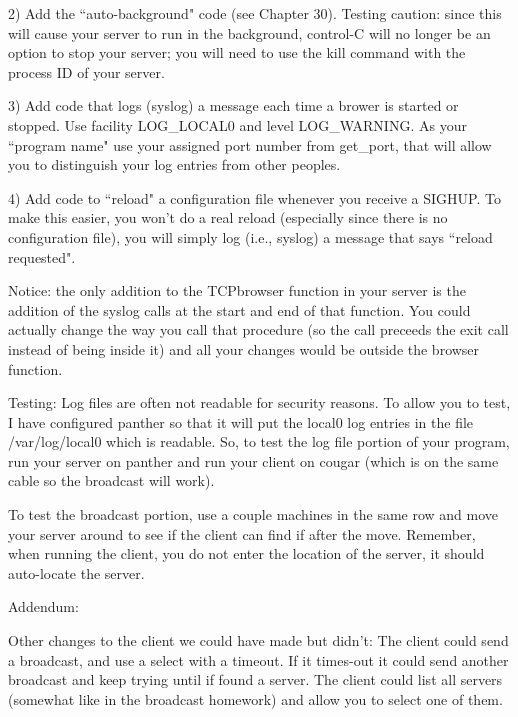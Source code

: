 2) Add the ``auto-background" code (see Chapter 30).
Testing caution: since this will cause your server to run in the background,
control-C will no longer be an option to stop your server; you will
need to use the {\ltt{}kill} command with the process ID of your server.

3) Add code that logs ({\ltt{}syslog}) a message each time a brower
is started or stopped. Use facility {\ltt{}LOG_LOCAL0}
and level {\ltt{}LOG_WARNING}.
As your ``program name" use your assigned port number from {\ltt{}get_port},
that will allow you to distinguish your log entries from other peoples.

4) Add code to ``reload" a configuration file whenever you
receive a {\ltt{}SIGHUP}.
To make this easier, you won't do a real reload (especially since
there is no configuration file), you will simply
log (i.e., {\ltt{}syslog}) a message that says ``reload requested".

Notice: the only addition to the {\ltt{}TCPbrowser} function in your server
is the addition of the {\ltt{}syslog} calls at the start and end of that
function.
You could actually change the way you call that procedure (so the call
preceeds the exit call instead of being inside it) and all your changes
would be outside the browser function.

Testing:
Log files are often not readable for security reasons.
To allow you to test,
I have configured {\ltt{}panther} so that it will put the {\ltt{}local0} log entries
in the file {\ltt{}/var/log/local0} which is readable.
So, to test the log file portion of your program, run your server on {\ltt{}panther} and run
your client on {\ltt{}cougar} (which is on the same cable so the
broadcast will work).

To test the broadcast portion, use a couple machines in the same row
and move your server around to see if the client can find if after
the move. Remember, when running the client, you do not enter the location
of the server, it should auto-locate the server.

Addendum:

Other changes to the client we could have made but didn't:
The client could send a broadcast, and use a select with a timeout.
If it times-out it could send another broadcast and keep trying until
if found a server.
The client could list all servers (somewhat like in the broadcast homework)
and allow you to select one of them.

\bye
